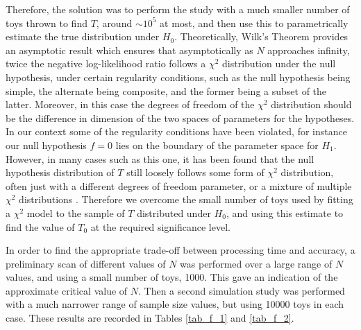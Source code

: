 \documentclass[12pt]{article}
\begin{document}
Therefore, the solution was to perform the study with a much smaller number of toys thrown to find $T$, around $\sim10^5$ at most, and then use this to parametrically estimate the true distribution under $H_0$.
Theoretically, Wilk's Theorem \cite{wilks} provides an asymptotic result which ensures that asymptotically as $N$ approaches infinity, twice the negative log-likelihood ratio follows a $\chi^2$ distribution under the null hypothesis, under certain regularity conditions, such as the null hypothesis being simple, the alternate being composite, and the former being a subset of the latter.
Moreover, in this case the degrees of freedom of the $\chi^2$ distribution should be the difference in dimension of the two spaces of parameters for the hypotheses.
In our context some of the regularity conditions have been violated, for instance our null hypothesis $f=0$ lies on the boundary of the parameter space for $H_1$.
However, in many cases such as this one, it has been found that the null hypothesis distribution of $T$ still loosely follows some form of $\chi^2$ distribution, often just with a different degrees of freedom parameter, or a mixture of multiple $\chi^2$ distributions \cite{wilks_exc_1} \cite{wilks_exc_2}.
Therefore we overcome the small number of toys used by fitting a $\chi^2$ model to the sample of $T$ distributed under $H_0$, and using this estimate to find the value of $T_0$ at the required significance level.

In order to find the appropriate trade-off between processing time and accuracy, a preliminary scan of different values of $N$ was performed over a large range of $N$ values, and using a small number of toys, 1000.
This gave an indication of the approximate critical value of $N$.
Then a second simulation study was performed with a much narrower range of sample size values, but using 10000 toys in each case.
These results are recorded in Tables \ref{tab_f_1} and \ref{tab_f_2}.
\end{document}
